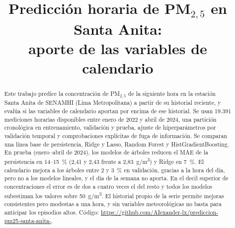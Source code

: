 \documentclass[conference]{IEEEtran}
\begin{document}
\title{Predicción horaria de PM$_{2{,}5}$ en Santa Anita:\\ aporte de las variables de calendario}

\author{
\and
{}
\and
{}
\and
{}
}

\maketitle

\begin{abstract}
Este trabajo predice la concentración de PM$_{2{,}5}$ de la siguiente hora en la estación Santa Anita de SENAMHI (Lima Metropolitana) a partir de su historial reciente, y evalúa si las variables de calendario aportan por encima de ese historial. Se usan 19.391 mediciones horarias disponibles entre enero de 2022 y abril de 2024, una partición cronológica en entrenamiento, validación y prueba, ajuste de hiperparámetros por validación temporal y comprobaciones explícitas de fuga de información. Se comparan una línea base de persistencia, Ridge y Lasso, Random Forest y HistGradientBoosting. En prueba (enero--abril de 2024), los modelos de árboles reducen el MAE de la persistencia en 14--15~\% (2,41 y 2,43 frente a 2,83~\textmu g/m\textsuperscript{3}) y Ridge en 7~\%. El calendario mejora a los árboles entre 2 y 3~\% en validación, gracias a la hora del día, pero no a los modelos lineales, y el día de la semana no aporta. En el decil superior de concentraciones el error es de dos a cuatro veces el del resto y todos los modelos subestiman los valores sobre 50~\textmu g/m\textsuperscript{3}. El historial propio de la serie permite mejoras consistentes pero modestas a una hora, y sin variables meteorológicas no basta para anticipar los episodios altos. Código: \url{https://github.com/AIexander-lx/prediccion-pm25-santa-anita-}.
\end{abstract}
\end{document}
